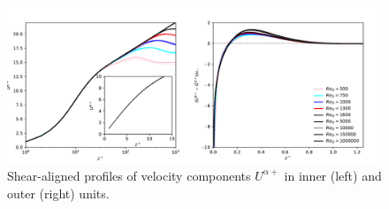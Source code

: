 \documentclass[a4paper,11pt]{amsart}
\begin{document}
%
\begin{figure}
  \includegraphics[width=\textwidth]{../plot/u_profile.pdf}
  \caption{Shear-aligned profiles of velocity components $U^{\alpha+}$ in inner (left) and outer (right) units.} 
\end{figure} 
%
%
\end{document}
